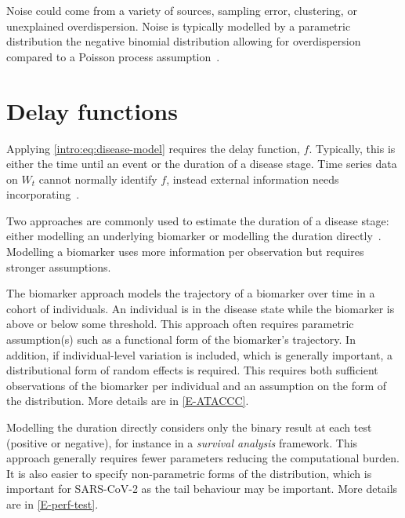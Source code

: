 \documentclass[thesis.tex]{subfiles}
\begin{document}
Noise could come from a variety of sources, \eg sampling error, clustering, or unexplained overdispersion.
Noise is typically modelled by a parametric distribution \eg the negative binomial distribution allowing for overdispersion compared to a Poisson process assumption~\autocite[e.g.][]{birrellRealtimea,frassoBayesian}.

\section{Delay functions}

Applying \cref{intro:eq:disease-model} requires the delay function, $f$.
Typically, this is either the time until an event or the duration of a disease stage.
Time series data on $W_t$ cannot normally identify $f$, instead external information needs incorporating~\autocite{swallow2022challenges}.

Two approaches are commonly used to estimate the duration of a disease stage: either modelling an underlying biomarker or modelling the duration directly~\autocite[e.g.][]{sweetingEstimating}.
Modelling a biomarker uses more information per observation but requires stronger assumptions.

The biomarker approach models the trajectory of a biomarker over time in a cohort of individuals.
An individual is in the disease state while the biomarker is above or below some threshold.
This approach often requires parametric assumption(s) such as a functional form of the biomarker's trajectory.
In addition, if individual-level variation is included, which is generally important, a distributional form of random effects is required.
This requires both sufficient observations of the biomarker per individual and an assumption on the form of the distribution.
More details are in \cref{E-ATACCC}.

Modelling the duration directly considers only the binary result at each test (positive or negative), for instance in a \emph{survival analysis} framework.
This approach generally requires fewer parameters reducing the computational burden.
It is also easier to specify non-parametric forms of the distribution, which is important for SARS-CoV-2 as the tail behaviour may be important.
More details are in \cref{E-perf-test}.
\end{document}

